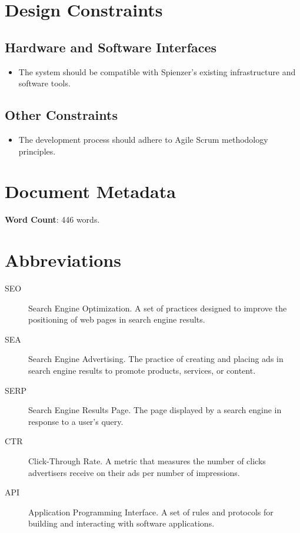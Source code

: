 \documentclass[12pt]{article}
\begin{document}
\section{Design Constraints}

\subsection{Hardware and Software Interfaces}
\begin{itemize}
    \item The system should be compatible with Spienzer's existing infrastructure and software tools.
\end{itemize}

\subsection{Other Constraints}
\begin{itemize}
    \item The development process should adhere to Agile Scrum methodology principles.
\end{itemize}

\newpage %
\section*{Document Metadata}
\textbf{Word Count}: 446 words.
\newpage 
\section*{Abbreviations}
\begin{description}
    \item[SEO] Search Engine Optimization. A set of practices designed to improve the positioning of web pages in search engine results.
    \item[SEA] Search Engine Advertising. The practice of creating and placing ads in search engine results to promote products, services, or content.
    \item[SERP] Search Engine Results Page. The page displayed by a search engine in response to a user's query.
    \item[CTR] Click-Through Rate. A metric that measures the number of clicks advertisers receive on their ads per number of impressions.
    \item[API] Application Programming Interface. A set of rules and protocols for building and interacting with software applications.
\end{description}
\end{document}
